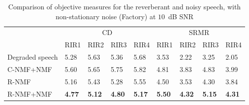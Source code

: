 \begin{table}[hbt]
\centering
\caption{Comparison of objective measures for the reverberant and noisy speech, with non-stationary noise (Factory) at $10$~dB SNR}
\label{tab:10dBnonStat}
\begin{tabular}{|l|l|l|l|l|l|l|l|l|}
\hline
\multirow{2}{*}{} & \multicolumn{4}{c|}{CD}                                       & \multicolumn{4}{c|}{SRMR}                                     \\ \cline{2-9} 
                  & RIR1          & RIR2          & RIR3          & RIR4          & RIR1          & RIR2          & RIR3          & RIR4          \\ \hline
Degraded speech   & 5.28          & 5.63          & 5.36          & 5.68          & 3.53          & 2.22          & 3.25          & 2.05          \\ \hline
C-NMF+NMF~\cite{mohammadiha2016speech,Mohammadiha2015}         & 5.60          & 5.65          & 5.75          & 5.82          & 4.81          & 3.83          & 4.83          & 3.99          \\ \hline
R-NMF             & 5.16          & 5.43          & 5.28          & 5.55          & 4.50          & 3.53          & 4.30          & 3.84          \\ \hline
R-NMF+NMF          & \textbf{4.77} & \textbf{5.12} & \textbf{4.80} & \textbf{5.17} & \textbf{5.50} & \textbf{4.32} & \textbf{5.15} & \textbf{4.31} \\ \hline
\end{tabular}
\end{table}
